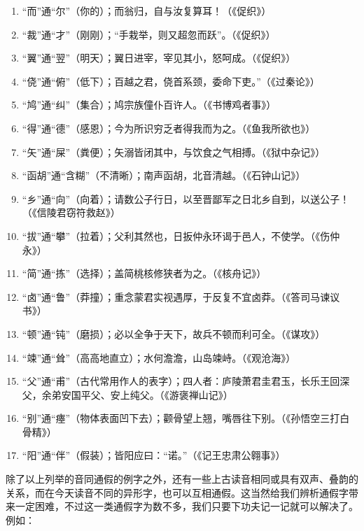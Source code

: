 \begin{enumerate}[label=\textcircled{\arabic*}]
\item “而”通“尔”（你的）；而翁归，自与汝复算耳！（《促织》）
\item “裁”通“才”（刚刚）；“手栽举，则又超忽而跃”。（《促织》）
\item “翼”通“翌”（明天）；翼日进宰，宰见其小，怒呵成。（《促织》）
\item “侥”通“俯”（低下）；百越之君，侥首系颈，委命下吏。”（《过秦论》）
\item “鸠”通“纠”（集合）；鸠宗族僮仆百许人。（《书博鸡者事》）
\item “得”通“德”（感恩）；今为所识穷乏者得我而为之。（《鱼我所欲也》）
\item “矢”通“屎”（粪便）；矢溺皆闭其中，与饮食之气相搏。（《狱中杂记》）
\item “函胡”通“含糊”（不清晰）；南声函胡，北音清越。（《石钟山记》）
\item “乡”通“向”（向着）；请数公子行日，以至晋鄙军之日北乡自到，以送公子！（《信陵君窃符救赵》）
\item “拔”通“攀”（拉着）；父利其然也，日扳仲永环谒于邑人，不使学。（《伤仲永》）
\item “简”通“拣”（选择）；盖简桃核修狭者为之。（《核舟记》）
\item “卤”通“鲁”（莽撞）；重念蒙君实视遇厚，于反复不宜卤莽。（《答司马谏议书》）
\item “顿”通“钝”（磨损）；必以全争于天下，故兵不顿而利可全。（《谋攻》）
\item “竦”通“耸”（高高地直立）；水何澹澹，山岛竦峙。（《观沧海》）
\item “父”通“甫”（古代常用作人的表字）；四人者：庐陵萧君圭君玉，长乐王回深父，余弟安国平父、安上纯父。（《游褒禅山记》）
\item “别”通“瘞”（物体表面凹下去）；颧骨望上翘，嘴唇往下别。（《孙悟空三打白骨精》）
\item “阳”通“伴”（假装）；皆阳应曰：“诺。”（《记王忠肃公翱事》）
\end{enumerate}

除了以上列举的音同通假的例字之外，还有一些上古读音相同或具有双声、叠韵的关系，而在今天读音不同的异形字，也可以互相通假。这当然给我们辨析通假字带来一定困难，不过这一类通假字为数不多，我们只要下功夫记一记就可以解决了。例如：

